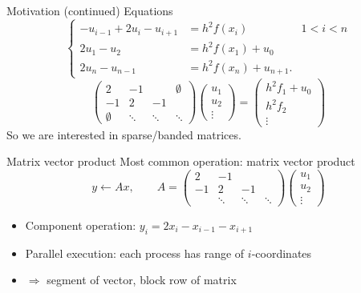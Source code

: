 \begin{numberedframe}{Motivation (continued)}
  Equations
  \[ \left\{
  \begin{array}{rll}
    -u_{i-1} + 2u_i - u_{i+1} &= h^2f(x_i)&1<i<n \\
    2u_1-u_2                  &=h^2f(x_1)+u_0\\
    2u_n-u_{n-1}              &=h^2f(x_{n})+u_{n+1}.
  \end{array}
  \right.
  \]
  \begin{equation}
    \begin{pmatrix}
      2&-1&&\emptyset\\ -1&2&-1\\ \emptyset&\ddots&\ddots&\ddots
    \end{pmatrix}
    \begin{pmatrix}
      u_1\\ u_2\\ \vdots
    \end{pmatrix}
    =
    \begin{pmatrix}
      h^2f_1+u_0\\ h^2f_2\\ \vdots
    \end{pmatrix}
    \label{eq:1d2nd-matrix-vector}
  \end{equation}
  So we are interested in sparse/banded matrices.
\end{numberedframe}

\begin{numberedframe}{Matrix vector product}
  Most common operation: matrix vector product
  \[ y\leftarrow Ax,\qquad
  A = \begin{pmatrix}
      2&-1\\ -1&2&-1\\ &\ddots&\ddots&\ddots
    \end{pmatrix}
    \begin{pmatrix}
      u_1\\ u_2\\ \vdots
    \end{pmatrix}
  \]
  \begin{itemize}
  \item Component operation: $y_i=2x_i-x_{i-1}-x_{i+1}$
  \item Parallel execution: each process has range of $i$-coordinates
  \item $\Rightarrow$ segment of vector, block row of matrix
  \end{itemize}  
\end{numberedframe}


